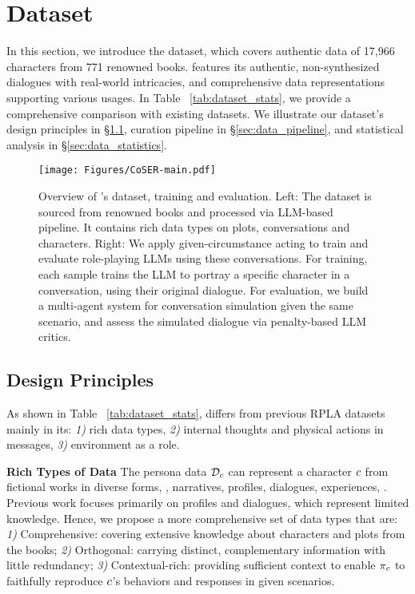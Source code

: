 \section{\method Dataset}

In this section, we introduce the \method dataset, which covers authentic data of 17,966 characters from 771 renowned books. 
\method features its authentic, non-synthesized dialogues with real-world intricacies, and comprehensive data representations supporting various usages. 
In Table ~\ref{tab:dataset_stats}, we provide a comprehensive comparison with existing datasets. 
We illustrate our dataset's design principles in \S\ref{sec:data_design},  curation pipeline in \S\ref{sec:data_pipeline}, and statistical analysis in \S\ref{sec:data_statistics}.

\begin{figure*}[!t]
    \centering
    \texttt{[image: Figures/CoSER-main.pdf]}
    \vspace{0.2cm}
    \caption{
    Overview of \method's dataset, training and evaluation. 
    Left: The \method dataset is sourced from renowned books and processed via LLM-based pipeline. 
    It contains rich data types on plots, conversations and characters.  
    Right: 
    We apply given-circumstance acting to train and evaluate role-playing LLMs using these conversations.  
    For training, each sample trains the LLM to portray  a specific character in a conversation, using their  original dialogue.  
    For evaluation, 
    we build a multi-agent system for conversation simulation given the same scenario, and assess the simulated dialogue via  penalty-based LLM critics. 
    }
    \label{fig:main}
\end{figure*}

\subsection{Design Principles}
\label{sec:data_design}

As shown in Table ~\ref{tab:dataset_stats}, \method differs from previous RPLA datasets mainly in its:  
\textit{1)} rich data types, 
\textit{2)} internal thoughts and physical actions in messages,
\textit{3)} environment as a role.


\textbf{Rich Types of Data} \quad 
The persona data $\mathcal{D}_c$ can represent a character $c$ from fictional works in diverse forms, \eg, narratives, profiles, dialogues, experiences, \etc. 
Previous work focuses primarily on profiles and dialogues, which represent limited knowledge.  
Hence, we propose a more comprehensive set of data types that are: 
\textit{1)} Comprehensive: covering extensive knowledge about characters and plots from the books; 
\textit{2)} Orthogonal: carrying distinct, complementary information with little redundancy;
\textit{3)} Contextual-rich: providing sufficient context to enable $\pi_c$ to faithfully reproduce $c$'s behaviors and responses in given scenarios.


